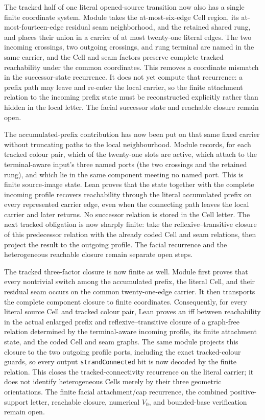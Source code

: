 \documentclass[11pt]{article}
\theoremstyle{definition}
\begin{document}
The tracked half of one literal opened-source transition now also has a
single finite coordinate system.  Module
takes the at-most-six-edge Cell region, its at-most-fourteen-edge residual
seam neighborhood, and the retained shared rung, and places their union in a
carrier of at most twenty-one literal edges.  The two incoming crossings, two
outgoing crossings, and rung terminal are named in the same carrier, and the
Cell and seam factors preserve complete tracked reachability under the common
coordinates.  This removes a coordinate mismatch in the successor-state
recurrence.  It does not yet compute that recurrence: a prefix path may leave
and re-enter the local carrier, so the finite attachment relation to the
incoming prefix state must be reconstructed explicitly rather than hidden in
the local letter.  The facial successor state and reachable closure remain
open.

The accumulated-prefix contribution has now been put on that same fixed
carrier without truncating paths to the local neighbourhood.  Module
records, for each tracked colour pair, which of the twenty-one slots are
active, which attach to the terminal-aware input's three named ports (the two
crossings and the retained rung), and which lie in the same component meeting
no named port.  This is finite source-image state.  Lean proves that the state
together with the complete incoming profile recovers reachability through the
literal accumulated prefix on every represented carrier edge, even when the
connecting path leaves the local carrier and later returns.  No successor
relation is stored in the Cell letter.  The next tracked obligation is now
sharply finite: take the reflexive--transitive closure of this predecessor
relation with the already coded Cell and seam relations, then project the
result to the outgoing profile.  The facial recurrence and the heterogeneous
reachable closure remain separate open steps.

The tracked three-factor closure is now finite as well.  Module
first proves that every nontrivial switch among the accumulated prefix, the
literal Cell, and their residual seam occurs on the common twenty-one-edge
carrier.  It then transports the complete component closure to finite
coordinates.  Consequently, for every literal source Cell and tracked colour
pair, Lean proves an iff between reachability in the actual enlarged prefix
and reflexive--transitive closure of a graph-free relation determined by the
terminal-aware incoming profile, its finite attachment state, and the coded
Cell and seam graphs.  The same module projects this closure to the two
outgoing profile ports, including the exact tracked-colour guards, so every
output \texttt{strandConnected} bit is now decoded by the finite relation.
This closes the tracked-connectivity recurrence on the literal carrier; it
does not identify heterogeneous Cells merely by their three geometric
orientations.  The finite facial attachment/cap recurrence, the combined
positive-support letter, reachable closure, numerical $V_0$, and bounded-base
verification remain open.
\end{document}
